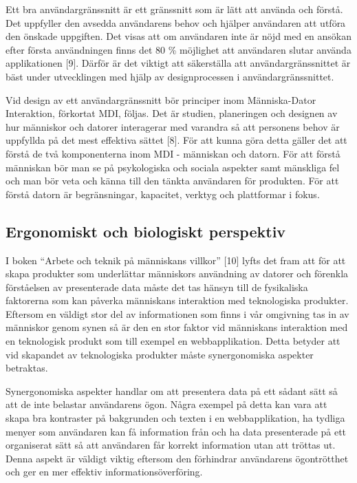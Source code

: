 \documentclass{kththesis}
\begin{document}
Ett bra användargränssnitt är ett gränssnitt som är lätt att använda och förstå. Det uppfyller den avsedda användarens behov och hjälper användaren att utföra den önskade uppgiften. Det visas att om användaren inte är nöjd med en ansökan efter första användningen finns det 80 \% möjlighet att användaren slutar använda applikationen [9]. Därför är det viktigt att säkerställa att användargränssnittet är bäst under utvecklingen med hjälp av designprocessen i användargränssnittet.

Vid design av ett användargränssnitt bör principer inom Människa-Dator Interaktion, förkortat MDI, följas. Det är studien, planeringen och designen av hur människor och datorer interagerar med varandra så att personens behov är uppfyllda på det mest effektiva sättet [8]. För att kunna göra detta gäller det att förstå de två komponenterna inom MDI - människan och datorn. För att förstå människan bör man se på psykologiska och sociala aspekter samt mänskliga fel och man bör veta och känna till den tänkta användaren för produkten. För att förstå datorn är begränsningar, kapacitet, verktyg och plattformar i fokus.

\subsection{Ergonomiskt och biologiskt perspektiv}

I boken “Arbete och teknik på människans villkor” [10] lyfts det fram att för att skapa produkter som underlättar människors användning av datorer och förenkla förståelsen av presenterade data måste det tas hänsyn till de fysikaliska faktorerna som kan påverka människans interaktion med teknologiska produkter. Eftersom en väldigt stor del av informationen som finns i vår omgivning tas in av människor genom synen så är den en stor faktor vid människans interaktion med en teknologisk produkt som till exempel en webbapplikation. Detta betyder att vid skapandet av teknologiska produkter måste synergonomiska aspekter betraktas. 

Synergonomiska aspekter handlar om att presentera data på ett sådant sätt så att de inte belastar användarens ögon. Några exempel på detta kan vara att skapa bra kontraster på bakgrunden och texten i en webbapplikation, ha tydliga menyer som användaren kan få information från och ha data presenterade på ett organiserat sätt så att användaren får korrekt information utan att tröttas ut. Denna aspekt är väldigt viktig eftersom den förhindrar användarens ögontrötthet och ger en mer effektiv informationsöverföring. 
\end{document}
